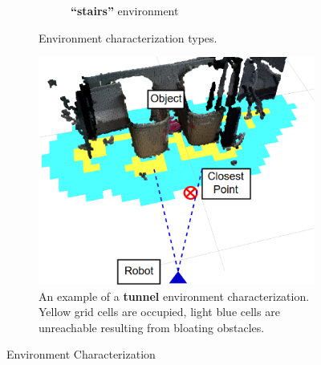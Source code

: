 \documentclass[12pt]{article}
\begin{document}
\begin{figure}[H]
\begin{subfigure}[t]{0.45\columnwidth}
\begin{subfigure}[t]{0.45\columnwidth}
        \caption{\textbf{``stairs''} environment}
    \end{subfigure}
      \caption{Environment characterization types.}
      \label{fig:characters}
\end{subfigure}
%
\begin{subfigure}{0.5\columnwidth}
\begin{center}
\includegraphics[width=\columnwidth]{images/characterization.png}
\caption{An example of a \textbf{tunnel} environment characterization. Yellow grid cells are occupied, light blue cells are unreachable resulting from bloating obstacles.}
\label{fig:characterization}
\end{center}
\end{subfigure}
\caption{Environment Characterization}
\end{figure}
\end{document}
